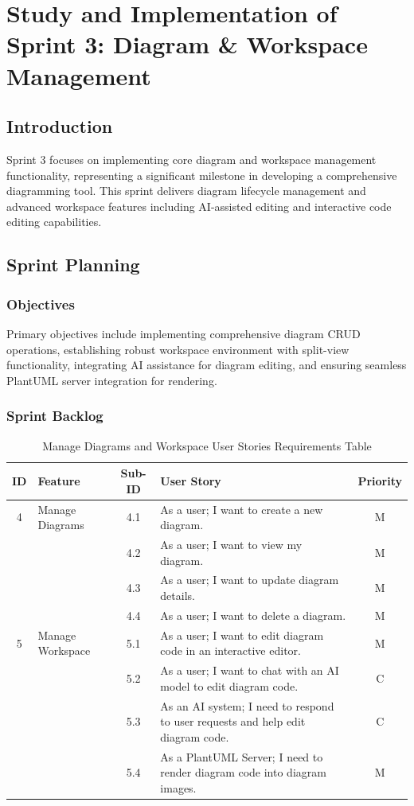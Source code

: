\chapter[Sprint 3]{Study and Implementation of Sprint 3: Diagram \& Workspace Management}

\section{Introduction}
Sprint 3 focuses on implementing core diagram and workspace management functionality, representing a significant milestone in developing a comprehensive diagramming tool. This sprint delivers diagram lifecycle management and advanced workspace features including AI-assisted editing and interactive code editing capabilities.

\section{Sprint Planning}

\subsection{Objectives}
Primary objectives include implementing comprehensive diagram CRUD operations, establishing robust workspace environment with split-view functionality, integrating AI assistance for diagram editing, and ensuring seamless PlantUML server integration for rendering.

\subsection{Sprint Backlog}

\begin{table}[h]
    \centering
    \begin{tabular}{|c|l|c|p{8cm}|c|}
    \hline
    \textbf{ID} & \textbf{Feature} & \textbf{Sub-ID} & \textbf{User Story} & \textbf{Priority} \\
    \hline
    4 & Manage Diagrams & 4.1 & As a user; I want to create a new diagram. & M \\
    \hline
      &  & 4.2 & As a user; I want to view my diagram. & M \\
    \hline
      &  & 4.3 & As a user; I want to update diagram details. & M \\
    \hline
      &  & 4.4 & As a user; I want to delete a diagram. & M \\
    \hline
    5 & Manage Workspace & 5.1 & As a user; I want to edit diagram code in an interactive editor. & M \\
    \hline
      &  & 5.2 & As a user; I want to chat with an AI model to edit diagram code. & C \\
    \hline
      &  & 5.3 & As an AI system; I need to respond to user requests and help edit diagram code. & C \\
    \hline
      &  & 5.4 & As a PlantUML Server; I need to render diagram code into diagram images. & M \\
    \hline
    \end{tabular}
    \caption{Manage Diagrams and Workspace User Stories Requirements Table}
    \label{tab:diagrams_workspace}
    \end{table}
